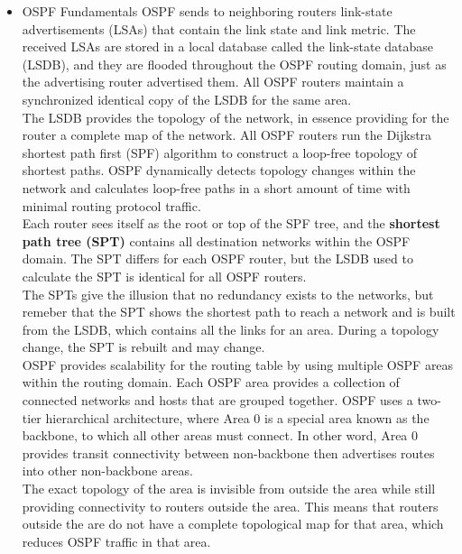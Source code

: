 \documentclass{article}
\begin{document}
\begin{itemize}
	\item OSPF Fundamentals
		OSPF sends to neighboring routers link-state advertisements (LSAs) that contain the link state and link metric. The received LSAs are stored in a local database called the link-state database (LSDB), and they are flooded throughout the OSPF routing domain, just as the advertising router advertised them. All OSPF routers maintain a synchronized identical copy of the LSDB for the same area.\\

		The LSDB provides the topology of the network, in essence providing for the router a complete map of the network. All OSPF routers run the Dijkstra shortest path first (SPF) algorithm to construct a loop-free topology of shortest paths. OSPF dynamically detects topology changes within the network and calculates loop-free paths in a short amount of time with minimal routing protocol traffic.\\

		Each router sees itself as the root or top of the SPF tree, and the \textbf{shortest path tree (SPT)} contains all destination networks within the OSPF domain. The SPT differs for each OSPF router, but the LSDB used to calculate the SPT is identical for all OSPF routers.\\

		The SPTs give the illusion that no redundancy exists to the networks, but remeber that the SPT shows the shortest path to reach a network and is built from the LSDB, which contains all the links for an area. During a topology change, the SPT is rebuilt and may change.\\

		OSPF provides scalability for the routing table by using multiple OSPF areas within the routing domain. Each OSPF area provides a collection of connected networks and hosts that are grouped together. OSPF uses a two-tier hierarchical architecture, where Area 0 is a special area known as the backbone, to which all other areas must connect. In other word, Area 0 provides transit connectivity between non-backbone then advertises routes into other non-backbone areas.\\

		The exact topology of the area is invisible from outside the area while still providing connectivity to routers outside the area. This means that routers outside the are do not have a complete topological map for that area, which reduces OSPF traffic in that area.\\


\end{itemize}
\end{document}
